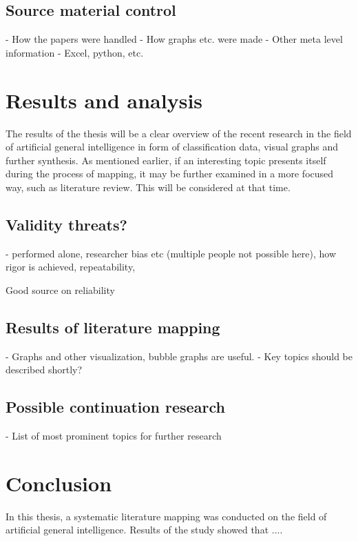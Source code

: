 \documentclass[utf8,english]{gradu3}
\begin{document}
\section{Source material control}
- How the papers were handled
- How graphs etc. were made
- Other meta level information
- Excel, python, etc.

\chapter{Results and analysis}
\label{results}

The results of the thesis will be a clear overview of the recent research in the
field of artificial general intelligence in form of classification data, visual
graphs and further synthesis. As mentioned earlier, if an interesting topic
presents itself during the process of mapping, it may be further examined in a
more focused way, such as literature review. This will be considered at that
time.

\section{Validity threats?}

- performed alone, researcher bias etc (multiple people not possible here),
how rigor is achieved, repeatability, 

Good source on reliability \cite{wohlin2013}

\section{Results of literature mapping}
- Graphs and other visualization, bubble graphs are useful.
- Key topics should be described shortly?

\section{Possible continuation research}

- List of most prominent topics for further research

\chapter{Conclusion}
In this thesis, a systematic literature mapping was conducted on the field of
artificial general intelligence. Results of the study showed that .... 

\printbibliography
\end{document}

